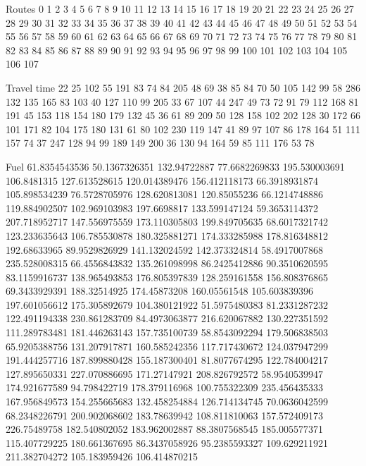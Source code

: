 Routes	0	1	2	3	4	5	6	7	8	9	10	11	12	13	14	15	16	17	18	19	20	21	22	23	24	25	26	27	28	29	30	31	32	33	34	35	36	37	38	39	40	41	42	43	44	45	46	47	48	49	50	51	52	53	54	55	56	57	58	59	60	61	62	63	64	65	66	67	68	69	70	71	72	73	74	75	76	77	78	79	80	81	82	83	84	85	86	87	88	89	90	91	92	93	94	95	96	97	98	99	100	101	102	103	104	105	106	107	

Travel time	22	25	102	55	191	83	74	84	205	48	69	38	85	84	70	50	105	142	99	58	286	132	135	165	83	103	40	127	110	99	205	33	67	107	44	247	49	73	72	91	79	112	168	81	191	45	153	118	154	180	179	132	45	36	61	89	209	50	128	158	102	202	128	30	172	66	101	171	82	104	175	180	131	61	80	102	230	119	147	41	89	97	107	86	178	164	51	111	157	74	37	247	128	94	99	189	149	200	36	130	94	164	59	85	111	176	53	78	

Fuel	61.8354543536	50.1367326351	132.94722887	77.6682269833	195.530003691	106.8481315	127.613528615	120.014389476	156.412118173	66.3918931874	105.898534239	76.5728705976	128.620813081	120.85055236	66.1214748886	119.884902507	102.969103983	197.6698817	133.599147124	59.3653114372	207.718952717	147.556975559	173.110305803	199.849705635	68.6017321742	123.233635643	106.785530878	180.325881271	174.333285988	178.816348812	192.68633965	89.9529826929	141.132024592	142.373324814	58.4917007868	235.528008315	66.4556843832	135.261098998	86.2425412886	90.3510620595	83.1159916737	138.965493853	176.805397839	128.259161558	156.808376865	69.3433929391	188.32514925	174.45873208	160.05561548	105.603839396	197.601056612	175.305892679	104.380121922	51.5975480383	81.2331287232	122.491194338	230.861283709	84.4973063877	216.620067882	130.227351592	111.289783481	181.446263143	157.735100739	58.8543092294	179.506838503	65.9205388756	131.207917871	160.585242356	117.717430672	124.037947299	191.444257716	187.899880428	155.187300401	81.8077674295	122.784004217	127.895650331	227.070886695	171.27147921	208.826792572	58.9540539947	174.921677589	94.798422719	178.379116968	100.755322309	235.456435333	167.956849573	154.255665683	132.458254884	126.714134745	70.0636042599	68.2348226791	200.902068602	183.78639942	108.811810063	157.572409173	226.75489758	182.540802052	183.962002887	88.3807568545	185.005577371	115.407729225	180.661367695	86.3437058926	95.2385593327	109.629211921	211.382704272	105.183959426	106.414870215	
